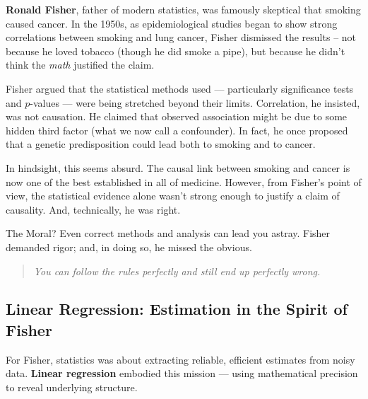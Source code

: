 \begin{tcolorbox}[title={\textbf{Historical Sidebar: Fisher, Smoking, and the Limits of Inference}}, colback=gray!5, colframe=black, fonttitle=\bfseries]

  \textbf{Ronald Fisher}, father of modern statistics, was famously skeptical that smoking caused cancer. In the 1950s, as epidemiological studies began to show strong correlations between smoking and lung cancer, Fisher dismissed the results -- not because he loved tobacco (though he did smoke a pipe), but because he didn’t think the \emph{math} justified the claim.

  \medskip
  
  Fisher argued that the statistical methods used --- particularly significance tests and \( p \)-values --- were being stretched beyond their limits. Correlation, he insisted, was not causation. He claimed that observed association might be due to some hidden third factor (what we now call a confounder). In fact, he once proposed that a genetic predisposition could lead both to smoking and to cancer.
  
  \medskip
  
  In hindsight, this seems absurd. The causal link between smoking and cancer is now one of the best established in all of medicine. However, from Fisher’s point of view, the statistical evidence alone wasn’t strong enough to justify a claim of causality. And, technically, he was right.
  
  \medskip
  
  The Moral? Even correct methods and analysis can lead you astray. Fisher demanded rigor; and, in doing so, he missed the obvious.
  
  \begin{quote}
    \textit{You can follow the rules perfectly and still end up perfectly wrong.}
  \end{quote}
    
  
\end{tcolorbox}

 
\subsection{Linear Regression: Estimation in the Spirit of Fisher}

For Fisher, statistics was about extracting reliable, efficient estimates from noisy data. \textbf{Linear regression} embodied this mission — using mathematical precision to reveal underlying structure.

